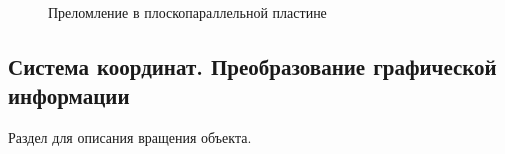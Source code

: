 \documentclass[12pt,a4paper,draft]{article}
\begin{document}
    \begin{figure}[H]%
            \noindent{}
            \caption{Преломление в плоскопараллельной пластине}
        \end{figure}
        
\subsection{Система координат. Преобразование графической информации}
    Раздел для описания вращения объекта.
\end{document}
